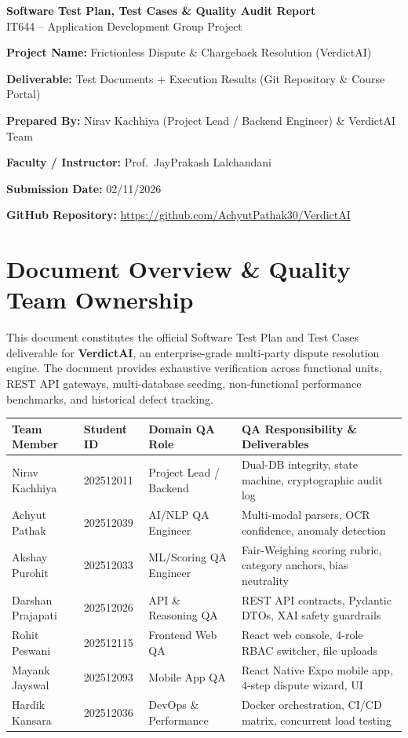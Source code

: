 \documentclass[11pt,a4paper]{article}
\newcommand{\field}[2]{\textbf{#1:} #2\par}
\begin{document}
\begin{center}
    {\LARGE\bfseries Software Test Plan, Test Cases \& Quality Audit Report}\\[6pt]
    {\large IT644 -- Application Development Group Project}\\[10pt]
\end{center}

\field{Project Name}{Frictionless Dispute \& Chargeback Resolution (VerdictAI)}
\field{Deliverable}{Test Documents + Execution Results (Git Repository \& Course Portal)}
\field{Prepared By}{Nirav Kachhiya (Project Lead / Backend Engineer) \& VerdictAI Team}
\field{Faculty / Instructor}{Prof.\ JayPrakash Lalchandani}
\field{Submission Date}{02/11/2026}
\field{GitHub Repository}{\url{https://github.com/AchyutPathak30/VerdictAI}}

\vspace{8pt}

\section{Document Overview \& Quality Team Ownership}

This document constitutes the official Software Test Plan and Test Cases deliverable for \textbf{VerdictAI}, an enterprise-grade multi-party dispute resolution engine. The document provides exhaustive verification across functional units, REST API gateways, multi-database seeding, non-functional performance benchmarks, and historical defect tracking.

\begin{table}[H]
\centering
\small
\renewcommand{\arraystretch}{1.2}
\begin{tabular}{p{3.2cm} p{2.2cm} p{3.2cm} p{6.0cm}}
\toprule
\textbf{Team Member} & \textbf{Student ID} & \textbf{Domain QA Role} & \textbf{QA Responsibility \& Deliverables} \\
\midrule
Nirav Kachhiya & 202512011 & Project Lead / Backend & Dual-DB integrity, state machine, cryptographic audit log \\
Achyut Pathak & 202512039 & AI/NLP QA Engineer & Multi-modal parsers, OCR confidence, anomaly detection \\
Akshay Purohit & 202512033 & ML/Scoring QA Engineer & Fair-Weighing scoring rubric, category anchors, bias neutrality \\
Darshan Prajapati & 202512026 & API \& Reasoning QA & REST API contracts, Pydantic DTOs, XAI safety guardrails \\
Rohit Peswani & 202512115 & Frontend Web QA & React web console, 4-role RBAC switcher, file uploads \\
Mayank Jayswal & 202512093 & Mobile App QA & React Native Expo mobile app, 4-step dispute wizard, UI \\
Hardik Kansara & 202512036 & DevOps \& Performance & Docker orchestration, CI/CD matrix, concurrent load testing \\
\bottomrule
\end{tabular}
\end{table}
\end{document}
